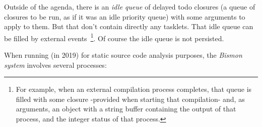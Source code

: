 Outside of the agenda, there is an \emph{idle queue} of delayed todo
closures (a queue of closures to be run, as if it was an idle priority
queue) with some arguments to apply to them. But that  don't contain directly any tasklets. That idle
queue can be filled by external events~\footnote{For example, when an
  external compilation process completes, that queue is filled with
  some closure -provided when starting that compilation- and, as
  arguments, an object with a string buffer containing the output of
  that process, and the integer status of that process.}. Of course the idle
queue is not persisted.

\bigskip

When running (in 2019) for static source code analysis purposes, the \emph{Bismon system} involves several processes:

